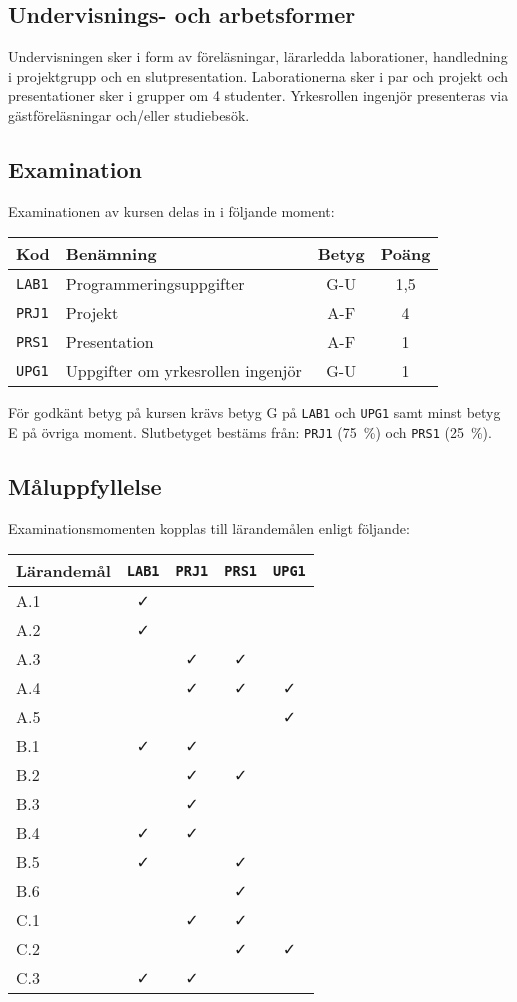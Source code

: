 \subsection*{Undervisnings- och arbetsformer}

Undervisningen sker i form av föreläsningar, lärarledda laborationer,
handledning i projektgrupp och en slutpresentation. Laborationerna sker
i par och projekt och presentationer sker i grupper om 4 studenter.
Yrkesrollen ingenjör presenteras via gästföreläsningar och/eller
studiebesök.

\subsection*{Examination}

Examinationen av kursen delas in i följande moment:

\begin{longtable}[]{@{}llcc@{}}
\toprule
\textsf{Kod} & \textsf{Benämning} & \textsf{Betyg} & \textsf{Poäng}\tabularnewline
\midrule
\endhead
\texttt{LAB1} & Programmeringsuppgifter & G-U & 1,5\tabularnewline
\texttt{PRJ1} & Projekt & A-F & 4\tabularnewline
\texttt{PRS1} & Presentation & A-F & 1\tabularnewline
\texttt{UPG1} & Uppgifter om yrkesrollen ingenjör & G-U & 1\tabularnewline
\bottomrule
\end{longtable}

För godkänt betyg på kursen krävs betyg G på \texttt{LAB1} och \texttt{UPG1} samt minst
betyg E på övriga moment. Slutbetyget bestäms från: \texttt{PRJ1} (75~\%) och \texttt{PRS1}
(25~\%).

\subsection*{Måluppfyllelse}

Examinationsmomenten kopplas till lärandemålen enligt följande:

\begin{longtable}[]{@{}lcccc@{}}
\toprule
\textsf{Lärandemål} & \texttt{LAB1} & \texttt{PRJ1} & \texttt{PRS1} & \texttt{UPG1}\tabularnewline
\midrule
\endhead
A.1 & \faCheck & & &\tabularnewline
A.2 & \faCheck & & &\tabularnewline
A.3 & & \faCheck & \faCheck &\tabularnewline
A.4 & & \faCheck & \faCheck & \faCheck\tabularnewline
A.5 & & & & \faCheck\tabularnewline
B.1 & \faCheck & \faCheck & &\tabularnewline
B.2 & & \faCheck & \faCheck &\tabularnewline
B.3 & & \faCheck & &\tabularnewline
B.4 & \faCheck & \faCheck & &\tabularnewline
B.5 & \faCheck & & \faCheck &\tabularnewline
B.6 & & & \faCheck &\tabularnewline
C.1 & & \faCheck & \faCheck &\tabularnewline
C.2 & & & \faCheck & \faCheck\tabularnewline
C.3 & \faCheck & \faCheck & &\tabularnewline
\bottomrule
\end{longtable}

